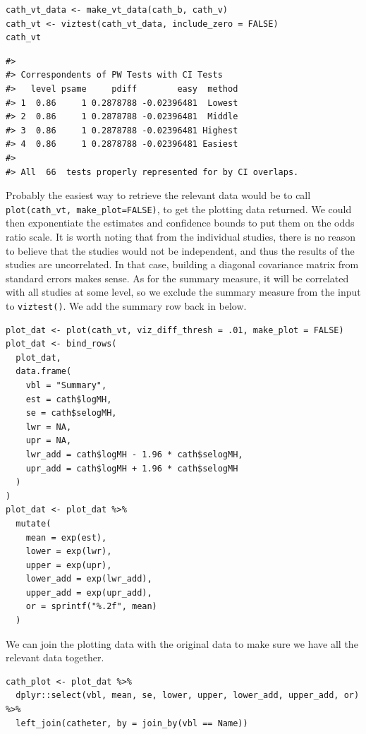 \begin{verbatim}
cath_vt_data <- make_vt_data(cath_b, cath_v)
cath_vt <- viztest(cath_vt_data, include_zero = FALSE)
cath_vt
\end{verbatim}

\begin{verbatim}
#> 
#> Correspondents of PW Tests with CI Tests
#>   level psame     pdiff        easy  method
#> 1  0.86     1 0.2878788 -0.02396481  Lowest
#> 2  0.86     1 0.2878788 -0.02396481  Middle
#> 3  0.86     1 0.2878788 -0.02396481 Highest
#> 4  0.86     1 0.2878788 -0.02396481 Easiest
#> 
#> All  66  tests properly represented for by CI overlaps.
\end{verbatim}

Probably the easiest way to retrieve the relevant data would be to call \texttt{plot(cath\_vt,\ make\_plot=FALSE)}, to get the plotting data returned. We could then exponentiate the estimates and confidence bounds to put them on the odds ratio scale. It is worth noting that from the individual studies, there is no reason to believe that the studies would not be independent, and thus the results of the studies are uncorrelated. In that case, building a diagonal covariance matrix from standard errors makes sense. As for the summary measure, it will be correlated with all studies at some level, so we exclude the summary measure from the input to \texttt{viztest()}. We add the summary row back in below.

\begin{verbatim}
plot_dat <- plot(cath_vt, viz_diff_thresh = .01, make_plot = FALSE)
plot_dat <- bind_rows(
  plot_dat,
  data.frame(
    vbl = "Summary",
    est = cath$logMH,
    se = cath$selogMH,
    lwr = NA,
    upr = NA,
    lwr_add = cath$logMH - 1.96 * cath$selogMH,
    upr_add = cath$logMH + 1.96 * cath$selogMH
  )
)
plot_dat <- plot_dat %>%
  mutate(
    mean = exp(est),
    lower = exp(lwr),
    upper = exp(upr),
    lower_add = exp(lwr_add),
    upper_add = exp(upr_add),
    or = sprintf("%.2f", mean)
  )
\end{verbatim}

We can join the plotting data with the original data to make sure we have all the relevant data together.

\begin{verbatim}
cath_plot <- plot_dat %>%
  dplyr::select(vbl, mean, se, lower, upper, lower_add, upper_add, or) %>%
  left_join(catheter, by = join_by(vbl == Name)) 
\end{verbatim}

